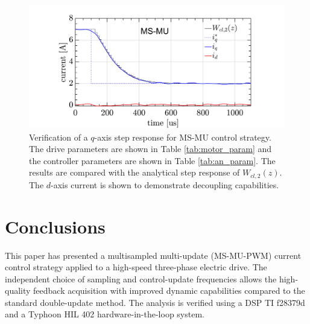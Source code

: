 \documentclass[conference]{IEEEtran}
\begin{document}
\begin{figure}[t!]
    \centerline{\includegraphics[width=1\linewidth]{figures/ivan figs/MSMUstepHIL.png}}
    \caption{Verification of a $q$-axis step response for MS-MU control strategy. The drive parameters are shown in Table \ref{tab:motor_param} and the controller parameters are shown in Table \ref{tab:an_param}. The results are compared with the analytical step response of $W_{cl,2}(z)$. The $d$-axis current is shown to demonstrate decoupling capabilities.}
    \label{fig:MSMUmaf_step} 
\end{figure}


\section{Conclusions}
This paper has presented a multisampled multi-update (MS-MU-PWM) current control strategy applied to a high-speed three-phase electric drive. The independent choice of sampling and control-update frequencies allows the high-quality feedback acquisition with improved dynamic capabilities compared to the standard double-update method. The analysis is verified using a DSP TI f28379d and a Typhoon HIL 402 hardware-in-the-loop system.

\ifCLASSOPTIONcaptionsoff
  \newpage
\fi



\end{document}
